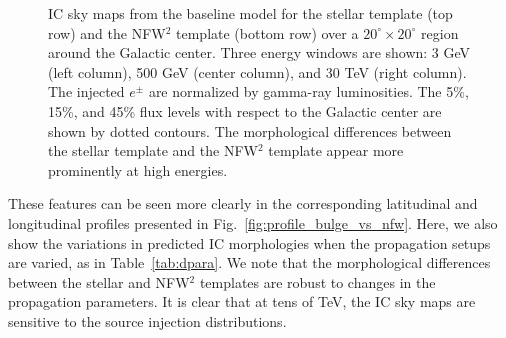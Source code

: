 \documentclass[doublespace,nopageskip]{VTthesis} %
\begin{document}
\begin{figure}[htb]
    \caption{IC sky maps from the baseline model for the stellar template (top row) and the NFW$^2$ template (bottom row) over a $20^\circ\times 20^\circ$ region around the Galactic center. Three energy windows are shown: 3 GeV (left column), 500 GeV (center column), and 30 TeV (right column). The injected $e^\pm$ are normalized by gamma-ray luminosities. The 5\%, 15\%, and 45\% flux levels with respect to the Galactic center are shown by dotted contours. The morphological differences between the stellar template and the NFW$^2$ template appear more prominently at high energies.}
    \label{fig:skymap_bulge_vs_nfw}
\end{figure}

These features can be seen more clearly in the corresponding latitudinal and longitudinal profiles presented in Fig.~\ref{fig:profile_bulge_vs_nfw}. Here, we also show the variations in predicted IC morphologies when the propagation setups are varied, as in Table~\ref{tab:dpara}. We note that the morphological differences between the stellar and NFW$^2$ templates are robust to changes in the propagation parameters. It is clear that at tens of TeV, the IC sky maps are sensitive to the source injection distributions.
\end{document}
